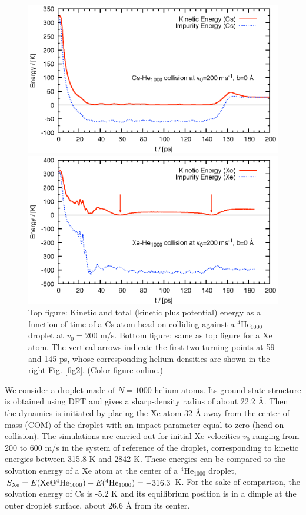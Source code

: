 		\begin{figure}[!]
			\centerline{\includegraphics[width=0.90\linewidth,clip]{fig3-Cs-He}} 
			\centerline{\includegraphics[width=0.90\linewidth,clip]{fig3-Xe-He}}
			\caption{\label{fig3}Top figure: Kinetic and total (kinetic plus potential) energy as a function of time  of a Cs atom head-on colliding against a  $^4$He$_{1000}$ droplet at  $v_0 = 200$ m/s. Bottom figure: same as top figure for a Xe atom. The vertical arrows indicate the first two turning points at 59 and 145 ps, whose corresponding helium densities are shown in the right Fig. \ref{fig2}. (Color figure online.)}
		\end{figure}

		We consider a droplet made of $N=1000$ helium atoms. 
Its ground state structure is obtained using DFT and gives a sharp-density  radius of about 22.2 \AA{}. 
Then the dynamics is initiated by placing the Xe atom 
32 \AA{} away from the center of mass (COM) of the droplet
with an impact parameter equal to zero (head-on collision).
The simulations are carried out 
for initial Xe velocities  $v_0$ ranging from 200 to  600 m/s in the system of reference of the droplet, corresponding
to kinetic energies between  315.8 K and  2842 K. 
These energies can be compared to
the solvation energy of a Xe atom at the center of a $^4$He$_{1000}$ droplet, 
$S_{{\rm Xe}} = E({\rm Xe}@^4{\rm He}_{1000}) - E(^4{\rm He}_{1000}) = -316.3$ K.
For the sake of comparison, the solvation energy of Cs is -5.2 K and its equilibrium position is  in a dimple at the outer droplet surface, 
about 26.6 \AA{} from its center. 

